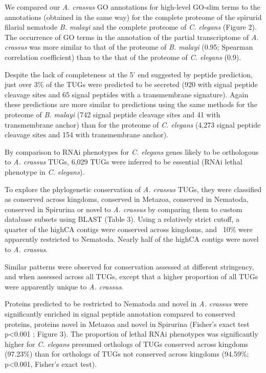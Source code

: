 \documentclass[10pt]{bmc_article}
\newenvironment{bmcformat}{\begin{raggedright}\baselineskip20pt\sloppy\setboolean{publ}{false}}{\end{raggedright}\baselineskip20pt\sloppy}
\begin{document}
\begin{bmcformat}
We compared our \textit{A. crassus} GO annotations for high-level
GO-slim terms to the annotations (obtained in the same way) for the
complete proteome of the spirurid filarial nematode \textit{B. malayi}
and the complete proteome of \textit{C. elegans} (Figure 2). The
occurrence of GO terms in the annotation of the partial transcriptome
of \textit{A. crassus} was more similar to that of the proteome of
\textit{B. malayi} (0.95; Spearman correlation coefficient) than to
the that of the proteome of \textit{C. elegans} (0.9).

Despite the lack of completeness at the 5' end suggested by peptide
prediction, just over 3\% of the TUGs were predicted to be secreted
(920 with signal peptide cleavage sites and
65 signal peptides with a transmembrane
signature). Again these predictions are more similar to predictions
using the same methods for the proteome of \textit{B. malayi} (742
signal peptide cleavage sites and 41 with transmembrane anchor) than
for the proteome of \textit{C. elegans} (4,273 signal peptide cleavage
sites and 154 with transmembrane anchor).

By comparison to RNAi phenotypes for \textit{C. elegans} genes
\cite{pmid12529635, pmid19910365} likely to be orthologous to
\textit{A. crassus} TUGs, 6,029 TUGs were inferred to be essential
(RNAi lethal phenotype in \textit{C. elegans}).

To explore the phylogenetic conservation of \textit{A. crassus} TUGs,
they were classified as conserved across kingdoms, conserved in
Metazoa, conserved in Nematoda, conserved in Spirurina or novel to
\textit{A. crassus} by comparing them to custom database subsets using
BLAST (Table 3). Using a relatively strict cutoff, a quarter of the
highCA contigs were conserved across kingdoms, and ~10\% were
apparently restricted to Nematoda. Nearly half of the highCA contigs
were novel to \textit{A. crassus}.

Similar patterns were observed for conservation assessed at different
stringency, and when assessed across all TUGs, except that a higher
proportion of all TUGs were apparently unique to \textit{A. crassus}.

Proteins predicted to be restricted to Nematoda and novel in
\textit{A. crassus} were significantly enriched in signal peptide
annotation compared to conserved proteins, proteins novel in Metazoa
and novel in Spirurina (Fisher's exact test p<0.001 ; Figure 3). The
proportion of lethal RNAi phenotypes was significantly higher for
\textit{C. elegans} presumed orthologs of TUGs conserved across
kingdoms (97.23\%) than for orthologs of TUGs not conserved across
kingdoms (94.59\%; p<0.001, Fisher's exact test).


\end{bmcformat}
\end{document}
